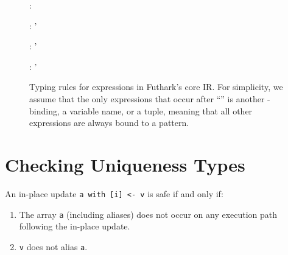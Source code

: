 \begin{figure}[bt]

{\Gamma \vd {} : \rho}


{\Gamma \vd {} : \rho'}

{\Gamma \vd {} : \rho'}

{\Gamma \vd {} : \rho'}

\caption{Typing rules for expressions in Futhark's core IR.  For
  simplicity, we assume that the only expressions that occur after
  ``'' is another -binding, a variable name, or a
  tuple, meaning that all other expressions are always bound to a
  pattern.}
\label{fig:srcTypeRulesExps}

\end{figure}


\FloatBarrier
\section{Checking Uniqueness Types}
\label{sec:uniqueness-formalism}

An in-place update \lstinline{a with [i] <- v} is safe if and only if:

\begin{enumerate}
\item The array \texttt{a} (including aliases) does not occur on any
  execution path following the in-place update.
\item \texttt{v} does not alias \texttt{a}.
\end{enumerate}


